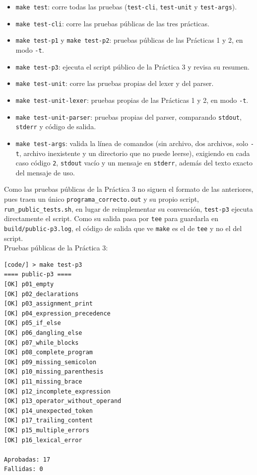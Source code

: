 \documentclass[12pt,letterpaper]{article}
\begin{document}
\begin{itemize}
\item \texttt{make test}: corre todas las pruebas (\texttt{test-cli}, \texttt{test-unit} y \texttt{test-args}).
\item \texttt{make test-cli}: corre las pruebas públicas de las tres prácticas.
\item \texttt{make test-p1} y \texttt{make test-p2}: pruebas públicas de las Prácticas 1 y 2, en modo
  \texttt{-t}.
\item \texttt{make test-p3}: ejecuta el script público de la Práctica 3 y revisa su resumen.
\item \texttt{make test-unit}: corre las pruebas propias del lexer y del parser.
\item \texttt{make test-unit-lexer}: pruebas propias de las Prácticas 1 y 2, en modo \texttt{-t}.
\item \texttt{make test-unit-parser}: pruebas propias del parser, comparando \texttt{stdout},
  \texttt{stderr} y código de salida.
\item \texttt{make test-args}: valida la línea de comandos (sin archivo, dos archivos, solo \texttt{-t},
  archivo inexistente y un directorio que no puede leerse), exigiendo en cada caso código \texttt{2},
  \texttt{stdout} vacío y un mensaje en \texttt{stderr}, además del texto exacto del mensaje de uso.
\end{itemize}

Como las pruebas públicas de la Práctica 3 no siguen el formato de las anteriores, pues traen un único
\texttt{programa\_correcto.out} y su propio script, \texttt{run\_public\_tests.sh}, en lugar de reimplementar su
convención, \texttt{test-p3} ejecuta directamente el script. Como su salida pasa por \texttt{tee} para
guardarla en \texttt{build/public-p3.log}, el código de salida que ve \texttt{make} es el de \texttt{tee} y no
el del script.\\

Pruebas públicas de la Práctica 3:

\begin{verbatim}
[code/] > make test-p3
==== public-p3 ====
[OK] p01_empty
[OK] p02_declarations
[OK] p03_assignment_print
[OK] p04_expression_precedence
[OK] p05_if_else
[OK] p06_dangling_else
[OK] p07_while_blocks
[OK] p08_complete_program
[OK] p09_missing_semicolon
[OK] p10_missing_parenthesis
[OK] p11_missing_brace
[OK] p12_incomplete_expression
[OK] p13_operator_without_operand
[OK] p14_unexpected_token
[OK] p17_trailing_content
[OK] p15_multiple_errors
[OK] p16_lexical_error

Aprobadas: 17
Fallidas: 0
\end{verbatim}
\end{document}
